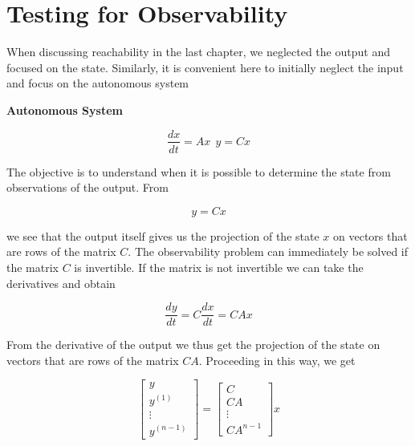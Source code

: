 \section{Testing for Observability}
\label{test_observability}

When discussing reachability in the last chapter, we neglected the output and focused on the state. Similarly, it is convenient here to initially neglect the input and
focus on the autonomous system



\begin{framed}
\theoremstyle{remark}
\begin{remark}{\textbf{Autonomous System}}

\end{remark}
\end{framed}

\begin{equation}
\frac{dx}{dt} = Ax ~~ y = Cx
\end{equation}

The objective is to understand when it is possible to determine the state from observations of the output. From

\begin{equation}
y = Cx
\end{equation}

we see that the output itself gives us the projection of the state $x$ on vectors that are rows of the matrix $C$. The 
observability problem can  immediately be solved if the matrix $C$ is invertible. If the matrix is not invertible we can take the derivatives and obtain

 
\begin{equation}
\frac{dy}{dt} = C\frac{dx}{dt} = CAx
\end{equation}

From the derivative of the output we thus get the projection of the state on vectors that are rows of the matrix $CA$. Proceeding in this way, we get

\begin{equation}
\begin{bmatrix}
 y \\
 y^{(1)} \\
 \vdots \\
 y^{(n-1)} 
\end{bmatrix} = 
\begin{bmatrix}
 C \\
 CA \\
 \vdots \\
 CA^{n-1} 
\end{bmatrix}x
\end{equation}

